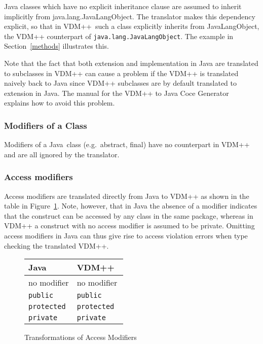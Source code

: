\documentclass[\pformat,12pt]{article}
\newcommand{\JAVA}{Java}
\newcommand{\VDM}{VDM++}
\begin{document}
Java classes which have no explicit inheritance clause are assumed to
inherit implicitly from java.lang.JavaLangObject. The translator makes this
dependency explicit, so that in \VDM\ such a class explicitly inherits
from JavaLangObject, the VDM++ counterpart of
\texttt{java.lang.JavaLangObject}. The example in Section~\ref{methods}
illustrates this.

Note that the fact that both extension and implementation in Java are
translated to subclasses in VDM++ can cause a problem if the VDM++ is
translated naively back to Java since VDM++ subclasses are by default
translated to extension in Java. The manual for the VDM++ to Java Coce
Generator~\cite{CGJavaManPP-CSK} explains how to avoid this problem. 

\subsubsection{Modifiers of a Class}

Modifiers of a \JAVA\ class (e.g.\ abstract, final) have no
counterpart in VDM++ and are all ignored by the translator. 

\subsubsection{Access modifiers}

Access modifiers are translated directly from Java to VDM++ as shown
in the table in Figure~\ref{fig:accessxfs}. Note, however, that in Java the absence
of a modifier indicates that the construct can be accessed by any
class in the same package, whereas in VDM++ a construct with no access
modifier is assumed to be private. Omitting access modifiers in Java
can thus give rise to access violation errors when type checking the
translated VDM++. 

\begin{figure}[htbp]
  \begin{center}
\begin{longtable}{|l|l|}
\hline
  \JAVA\   & \VDM\ \\ \hline \hline
  no modifier         & no modifier        \\ \hline
  \texttt{public}     & \texttt{public}    \\ \hline
  \texttt{protected}  & \texttt{protected} \\ \hline
  \texttt{private}  & \texttt{private} \\ \hline
\end{longtable}    
    \caption{Transformations of Access Modifiers}
    \label{fig:accessxfs}
  \end{center}
\end{figure}
\end{document}
